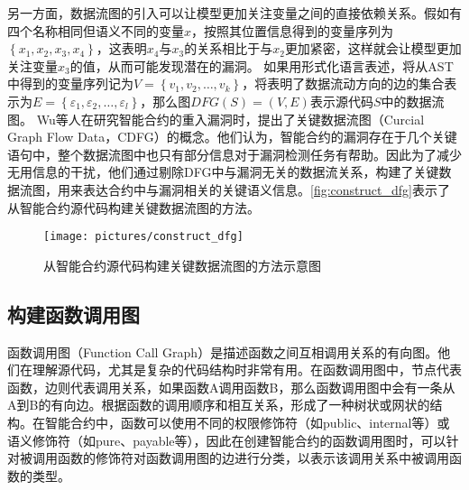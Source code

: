 另一方面，数据流图的引入可以让模型更加关注变量之间的直接依赖关系。假如有四个名称相同但语义不同的变量$x$，按照其位置信息得到的变量序列为$\left\{x_1, x_2, x_3, x_4\right\}$，这表明$x_4$与$x_3$的关系相比于与$x_2$更加紧密，这样就会让模型更加关注变量$x_3$的值，从而可能发现潜在的漏洞。
如果用形式化语言表述，将从AST中得到的变量序列记为$V=\left\{v_1, v_2, \ldots, v_k\right\}$，将表明了数据流动方向的边的集合表示为$E=\left\{\varepsilon_1, \varepsilon_2, \ldots, \varepsilon_l\right\}$，那么图$DFG(S)=(V, E)$表示源代码$S$中的数据流图。
Wu等人\cite{wu2021peculiar}在研究智能合约的重入漏洞时，提出了关键数据流图（Curcial Graph Flow Data，CDFG）的概念。他们认为，智能合约的漏洞存在于几个关键语句中，整个数据流图中也只有部分信息对于漏洞检测任务有帮助。因此为了减少无用信息的干扰，他们通过剔除DFG中与漏洞无关的数据流关系，构建了关键数据流图，用来表达合约中与漏洞相关的关键语义信息。\autoref{fig:construct_dfg}表示了从智能合约源代码构建关键数据流图的方法。
\begin{figure}[htbp]
    \centering
    \texttt{[image: pictures/construct\_dfg]}
    \caption{\label{fig:construct_dfg}从智能合约源代码构建关键数据流图的方法示意图}
\end{figure}

\subsection{构建函数调用图}
\label{sec:构建函数调用图}
函数调用图（Function Call Graph）是描述函数之间互相调用关系的有向图。他们在理解源代码，尤其是复杂的代码结构时非常有用。在函数调用图中，节点代表函数，边则代表调用关系，如果函数A调用函数B，那么函数调用图中会有一条从A到B的有向边。根据函数的调用顺序和相互关系，形成了一种树状或网状的结构。在智能合约中，函数可以使用不同的权限修饰符（如public、internal等）或语义修饰符（如pure、payable等），因此在创建智能合约的函数调用图时，可以针对被调用函数的修饰符对函数调用图的边进行分类，以表示该调用关系中被调用函数的类型。

